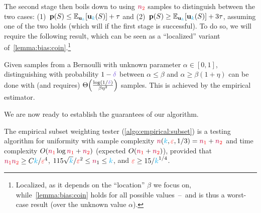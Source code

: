 The second stage then boils down to using $\textcolor{red}{{\textcolor{purple}{n}}_2}$ samples to distinguish between the two cases: (1)~$\p(S) \leq \bE{\uniform_\ab}{\uniform_\ab(S)} + \tau$ and (2)~$\p(S) \geq \bE{\uniform_\ab}{\uniform_\ab(S)} + 3\tau$, assuming one of the two holds (which will if the first stage is successful). To do so, we will require the following result, which can be seen as a ``localized'' variant of~\cref{lemma:bias:coin}.\footnote{Localized, as it depends on the ``location'' $\beta$ we focus on, while~\cref{lemma:bias:coin} holds for all possible values~--~and is thus a worst-case result (over the unknown value $\alpha$).}
\begin{fact}
  \label{lemma:bias:coin:test}
  Given \iid samples from a Bernoulli with unknown parameter $\alpha\in[0,1]$, distinguishing with probability $1-\errprob$ between $\alpha \leq \beta$ and $\alpha \geq \beta(1+\eta)$ can be done with (and requires) $\bigTheta{\frac{\log(1/\errprob)}{\beta\eta^2}}$ samples. This is achieved by the empirical estimator.
\end{fact} 
We are now ready to establish the guarantees of our algorithm.
\begin{theorem}
  \label{theo:empirical-subset}
The empirical subset weighting tester (\cref{algo:empirical:subset}) is a testing algorithm for uniformity with sample complexity ${\textcolor{purple}{n}}({\textcolor{cyan}{k}},\textcolor{red}{\varepsilon},1/3) = \textcolor{red}{{\textcolor{purple}{n}}_1}+\textcolor{red}{{\textcolor{purple}{n}}_2}$ and time complexity $O(\textcolor{red}{{\textcolor{purple}{n}}_1}\log\textcolor{red}{{\textcolor{purple}{n}}_1} + \textcolor{red}{{\textcolor{purple}{n}}_2})$ (expected $O(\textcolor{red}{{\textcolor{purple}{n}}_1}+\textcolor{red}{{\textcolor{purple}{n}}_2})$), provided that $\textcolor{red}{{\textcolor{purple}{n}}_1}\textcolor{red}{{\textcolor{purple}{n}}_2} \geq C{\textcolor{cyan}{k}}/\textcolor{red}{\varepsilon}^4$, $115\sqrt{{\textcolor{cyan}{k}}}/\textcolor{red}{\varepsilon}^2\leq {\textcolor{purple}{n}}_1 \leq {\textcolor{cyan}{k}}$, and $\textcolor{red}{\varepsilon} \geq 15/{\textcolor{cyan}{k}}^{1/4}$.
\end{theorem}
